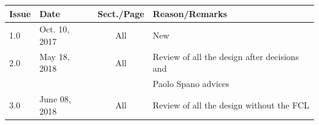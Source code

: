 
\newpage

\begin{center}
\begin{tabular}{llcl}
Issue & Date & Sect./Page & Reason/Remarks \\ \hline
1.0 & Oct. 10, 2017 & All & New \\ \hline
2.0 & May 18, 2018 & All & Review of all the design after decisions and\\
	&				&	 &Paolo Spano advices \\ \hline
3.0 & June 08, 2018 & All & Review of all the design without the FCL\\ \hline
\end{tabular}
\end{center}
\newpage
